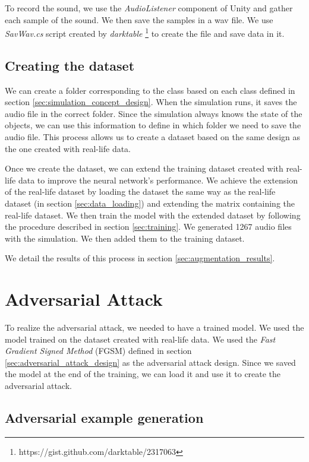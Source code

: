To record the sound, we use the \textit{AudioListener} component of Unity and gather each sample of the sound. We then save the samples in a wav file. We use \textit{SavWav.cs} script created by \textit{darktable} \footnote{https://gist.github.com/darktable/2317063} to create the file and save data in it.

\subsection{Creating the dataset}

We can create a folder corresponding to the class based on each class defined in section \ref{sec:simulation_concept_design}. When the simulation runs, it saves the audio file in the correct folder. Since the simulation always knows the state of the objects, we can use this information to define in which folder we need to save the audio file. This process allows us to create a dataset based on the same design as the one created with real-life data.

Once we create the dataset, we can extend the training dataset created with real-life data to improve the neural network's performance. We achieve the extension of the real-life dataset by loading the dataset the same way as the real-life dataset (in section \ref{sec:data_loading}) and extending the matrix containing the real-life dataset. We then train the model with the extended dataset by following the procedure described in section \ref{sec:training}. We generated 1267 audio files with the simulation. We then added them to the training dataset.

We detail the results of this process in section \ref{sec:augmentation_results}.

\section{Adversarial Attack}

To realize the adversarial attack, we needed to have a trained model. We used the model trained on the dataset created with real-life data. We used the \textit{Fast Gradient Signed Method} (FGSM) defined in section \ref{sec:adversarial_attack_design} as the adversarial attack design. Since we saved the model at the end of the training, we can load it and use it to create the adversarial attack.

\subsection{Adversarial example generation}

